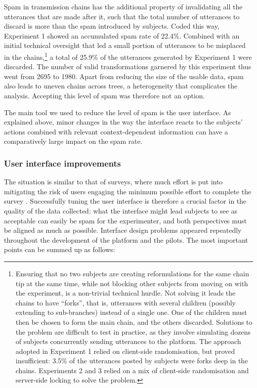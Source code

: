 Spam in transmission chains has the additional property of invalidating
all the utterances that are made after it, such that the total number of
utterances to discard is more than the spam introduced by subjects.
Coded this way, Experiment 1 showed an accumulated spam rate of 22.4\%.
Combined with an initial technical oversight that led a small portion of
utterances to be misplaced in the chains,\footnote{Ensuring that no two
  subjects are creating reformulations for the same chain tip at the
  same time, while not blocking other subjects from moving on with the
  experiment, is a non-trivial technical hurdle. Not solving it leads
  the chains to have \enquote{forks}, that is, utterances with several
  children (possibly extending to sub-branches) instead of a single one.
  One of the children must then be chosen to form the main chain, and
  the others discarded. Solutions to the problem are difficult to test
  in practice, as they involve simulating dozens of subjects
  concurrently sending utterances to the platform. The approach adopted
  in Experiment 1 relied on client-side randomisation, but proved
  insufficient: 3.5\% of the utterances posted by subjects were forks
  deep in the chains. Experiments 2 and 3 relied on a mix of client-side
  randomisation and server-side locking to solve the problem.} a total
of 25.9\% of the utterances generated by Experiment 1 were discarded.
The number of valid transformations garnered by this experiment thus
went from 2695 to 1980. Apart from reducing the size of the usable data,
spam also leads to uneven chains across trees, a heterogeneity that
complicates the analysis. Accepting this level of spam was therefore not
an option.

The main tool we used to reduce the level of spam is the user interface.
As explained above, minor changes in the way the interface reacts to the
subjects' actions combined with relevant context-dependent information
can have a comparatively large impact on the spam rate.

\subsubsection{User interface
improvements}\label{user-interface-improvements}

The situation is similar to that of surveys, where much effort is put
into mitigating the risk of users engaging the minimum possible effort
to complete the survey \autocite{krosnick_threat_2000}. Successfully
tuning the user interface is therefore a crucial factor in the quality
of the data collected: what the interface might lead subjects to see as
acceptable can easily be spam for the experimenter, and both
perspectives must be aligned as much as possible. Interface design
problems appeared repeatedly throughout the development of the platform
and the pilots. The most important points can be summed up as follows:

